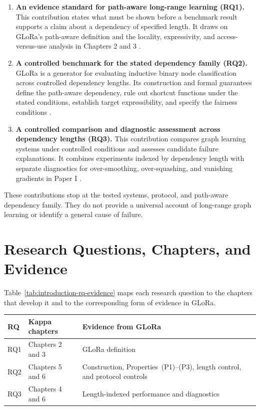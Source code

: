 \begin{enumerate}
\item \textbf{An evidence standard for path-aware long-range learning (RQ1).}
This contribution states what must be shown before a benchmark result supports a claim about a dependency of specified length.
It draws on GLoRa's path-aware definition and the locality, expressivity, and access-versus-use analysis in Chapters 2 and 3 \cite{zhou2025glora}.

\item \textbf{A controlled benchmark for the stated dependency family (RQ2).}
GLoRa is a generator for evaluating inductive binary node classification across controlled dependency lengths.
Its construction and formal guarantees define the path-aware dependency, rule out shortcut functions under the stated conditions, establish target expressibility, and specify the fairness conditions \cite{barcelo2020logical,zhou2025glora}.

\item \textbf{A controlled comparison and diagnostic assessment across dependency lengths (RQ3).}
This contribution compares graph learning systems under controlled conditions and assesses candidate failure explanations.
It combines experiments indexed by dependency length with separate diagnostics for over-smoothing, over-squashing, and vanishing gradients in Paper I \cite{zhou2025glora}.
\end{enumerate}

These contributions stop at the tested systems, protocol, and path-aware dependency family.
They do not provide a universal account of long-range graph learning or identify a general cause of failure.

\section{Research Questions, Chapters, and Evidence}

Table~\ref{tab:introduction-rq-evidence} maps each research question to the chapters that develop it and to the corresponding form of evidence in GLoRa.

\begin{center}
\centering
\begin{tabular}{L{0.12\textwidth}L{0.40\textwidth}L{0.34\textwidth}}
\hline
\textbf{RQ} & \textbf{Kappa chapters} & \textbf{Evidence from GLoRa} \\
\hline
RQ1 & Chapters 2 and 3 & GLoRa definition \\
RQ2 & Chapters 5 and 6 & Construction, Properties~(P1)--(P3), length control, and protocol controls \\
RQ3 & Chapters 4 and 6 & Length-indexed performance and diagnostics \\
\hline
\end{tabular}
\captionsetup{hypcap=false}
\captionsetup{hypcap=true}
\label{tab:introduction-rq-evidence}
\end{center}

